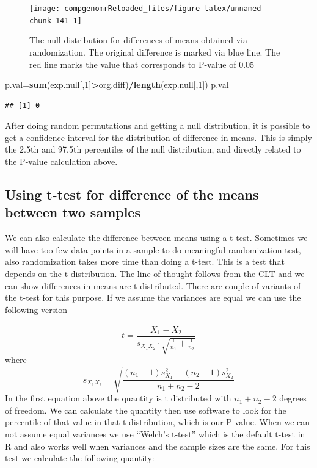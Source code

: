 \documentclass[12pt,]{krantz}
\newenvironment{Shaded}{\begin{snugshade}}{\end{snugshade}}
\newcommand{\DecValTok}[1]{\textcolor[rgb]{0.00,0.00,0.81}{#1}}
\newcommand{\KeywordTok}[1]{\textcolor[rgb]{0.13,0.29,0.53}{\textbf{#1}}}
\newcommand{\NormalTok}[1]{#1}
\newcommand{\OperatorTok}[1]{\textcolor[rgb]{0.81,0.36,0.00}{\textbf{#1}}}
\theoremstyle{definition}
\theoremstyle{definition}
\theoremstyle{definition}
\theoremstyle{remark}
\begin{document}
\begin{figure}

{\centering \texttt{[image: compgenomrReloaded\_files/figure-latex/unnamed-chunk-141-1]} 

}

\caption{The null distribution for differences of means obtained via randomization. The original difference is marked via blue line. The red line marks the value that corresponds to P-value of 0.05}\label{fig:unnamed-chunk-141}
\end{figure}

\begin{Shaded}
\begin{Highlighting}[]
\NormalTok{p.val=}\KeywordTok{sum}\NormalTok{(exp.null[,}\DecValTok{1}\NormalTok{]}\OperatorTok{>}\NormalTok{org.diff)}\OperatorTok{/}\KeywordTok{length}\NormalTok{(exp.null[,}\DecValTok{1}\NormalTok{])}
\NormalTok{p.val}
\end{Highlighting}
\end{Shaded}

\begin{verbatim}
## [1] 0
\end{verbatim}

After doing random permutations and getting a null distribution, it is
possible to get a confidence interval for the distribution of difference
in means. This is simply the 2.5th and 97.5th percentiles of the null
distribution, and directly related to the P-value calculation above.

\hypertarget{using-t-test-for-difference-of-the-means-between-two-samples}{%
\subsection{Using t-test for difference of the means between two
samples}\label{using-t-test-for-difference-of-the-means-between-two-samples}}

We can also calculate the difference between means using a t-test.
Sometimes we will have too few data points in a sample to do meaningful
randomization test, also randomization takes more time than doing a
t-test. This is a test that depends on the t distribution. The line of
thought follows from the CLT and we can show differences in means are t
distributed. There are couple of variants of the t-test for this
purpose. If we assume the variances are equal we can use the following
version

\[t = \frac{\bar {X}_1 - \bar{X}_2}{s_{X_1X_2} \cdot \sqrt{\frac{1}{n_1}+\frac{1}{n_2}}}\]
where
\[s_{X_1X_2} = \sqrt{\frac{(n_1-1)s_{X_1}^2+(n_2-1)s_{X_2}^2}{n_1+n_2-2}}\]
In the first equation above the quantity is t distributed with
\(n_1+n_2-2\) degrees of freedom. We can calculate the quantity then use
software to look for the percentile of that value in that t
distribution, which is our P-value. When we can not assume equal
variances we use ``Welch's t-test'' which is the default t-test in R and
also works well when variances and the sample sizes are the same. For
this test we calculate the following quantity:
\end{document}

